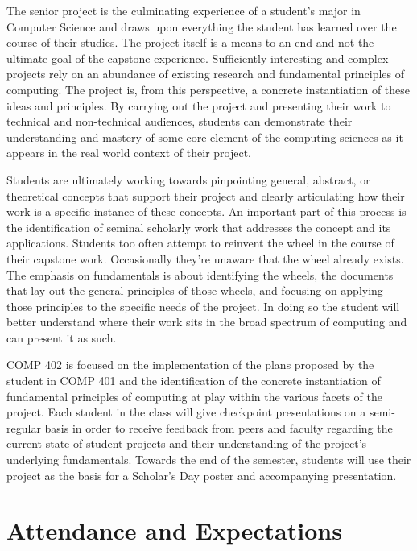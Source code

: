 \documentclass[]{article}
\begin{document}
The senior project is the culminating experience of a student's major in Computer Science and draws upon everything the student has learned over the course of their studies. The project itself is a means to an end and not the ultimate goal of the capstone experience. Sufficiently interesting and complex projects rely on an abundance of existing research and fundamental principles of computing.  The project is, from this perspective, a concrete instantiation of these ideas and principles. By carrying out the project and presenting their work to technical and non-technical audiences, students can demonstrate their understanding and mastery of some core element of the computing sciences as it appears in the real world context of their project.

Students are ultimately working towards pinpointing general, abstract, or theoretical concepts that support their project and clearly articulating how their work is a specific instance of these concepts. An important part of this process is the identification of seminal scholarly work that addresses the concept and its applications. Students too often attempt to reinvent the wheel in the course of their capstone work. Occasionally they're unaware that the wheel already exists. The emphasis on fundamentals is about identifying the wheels, the documents that lay out the general principles of those wheels, and focusing on applying those principles to the specific needs of the project. In doing so the student will better understand where their work sits in the broad spectrum of computing and can present it as such.

COMP 402 is focused on the implementation of the plans proposed by the student in COMP 401 and the identification of the concrete instantiation of fundamental principles of computing at play within the various facets of the project. Each student in the class will give checkpoint presentations on a semi-regular basis in order to receive feedback from peers and faculty regarding the current state of student projects and their understanding of the project's underlying fundamentals.   Towards the end of the semester, students will use their project as the basis for a Scholar's Day poster and accompanying presentation.



\section{Attendance and Expectations}
\end{document}
